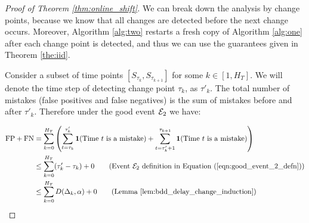 \begin{proof}[Proof of Theorem \ref{thm:online_shift}]
    
We can break down the analysis by change points, because we know that all changes are detected before the next change occurs. Moreover, Algorithm \ref{alg:two} restarts a fresh copy of Algorithm \ref{alg:one} after each change point is detected, and thus we can use the guarantees given in Theorem \ref{the:iid}.

Consider a subset of time points $[S_{\tau_k}, S_{\tau_{k+1}}]$ for some $ k\in[1,H_T]$. We will denote the time step of detecting change point $\tau_k$,  as $\tau'_k$.  The total number of mistakes (false positives and false negatives) is the sum of mistakes before and after $\tau'_k$. Therefore under the good event ${\mathcal{E}}_2$ we have:

\begin{align*}
    \text{FP} + \text{FN} &= \sum_{k=0}^{H_T} \left( \sum_{t=\tau_k}^{\tau'_k} \mathbf{1}(\text{Time $t$ is a mistake)} + \sum_{t=\tau'_k + 1}^{\tau_{k+1}} \mathbf{1}(\text{Time $t$ is a mistake)} \right) \\
    &\leq \sum_{k=0}^{H_T} (\tau'_k - \tau_k) + 0 \quad \quad \text{(Event ${\mathcal{E}}_2$ definition in Equation (\ref{eqn:good_event_2_defn}))}\\
    &\leq \sum_{k=0}^{H_T} D(\Delta_k, \alpha) + 0 \quad \quad \text{(Lemma \ref{lem:bdd_delay_change_induction})}\\
\end{align*}


\end{proof}
